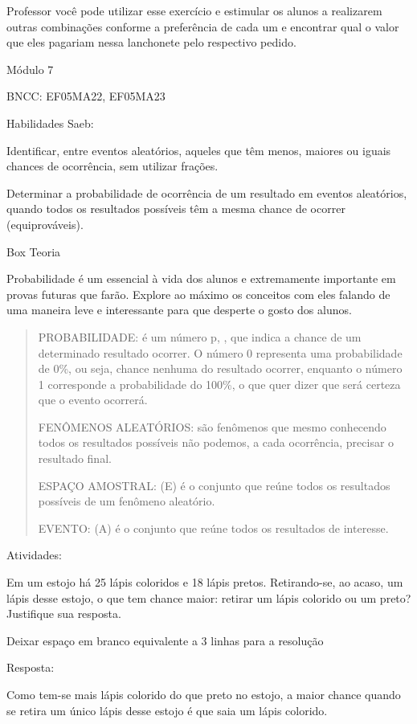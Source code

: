 Professor você pode utilizar esse exercício e estimular os alunos a
realizarem outras combinações conforme a preferência de cada um e
encontrar qual o valor que eles pagariam nessa lanchonete pelo
respectivo pedido.

Módulo 7

BNCC: EF05MA22, EF05MA23

Habilidades Saeb:

Identificar, entre eventos aleatórios, aqueles que têm menos, maiores ou
iguais chances de ocorrência, sem utilizar frações.

Determinar a probabilidade de ocorrência de um resultado em eventos
aleatórios, quando todos os resultados possíveis têm a mesma chance de
ocorrer (equiprováveis).

Box Teoria

Probabilidade é um essencial à vida dos alunos e extremamente importante
em provas futuras que farão. Explore ao máximo os conceitos com eles
falando de uma maneira leve e interessante para que desperte o gosto dos
alunos.

\begin{quote}
PROBABILIDADE: é um número p, , que indica a chance de um determinado
resultado ocorrer. O número 0 representa uma probabilidade de 0\%, ou
seja, chance nenhuma do resultado ocorrer, enquanto o número 1
corresponde a probabilidade do 100\%, o que quer dizer que será certeza
que o evento ocorrerá.

FENÔMENOS ALEATÓRIOS: são fenômenos que mesmo conhecendo todos os
resultados possíveis não podemos, a cada ocorrência, precisar o
resultado final.

ESPAÇO AMOSTRAL: (E) é o conjunto que reúne todos os resultados
possíveis de um fenômeno aleatório.

EVENTO: (A) é o conjunto que reúne todos os resultados de interesse.
\end{quote}

Atividades:

Em um estojo há 25 lápis coloridos e 18 lápis pretos. Retirando-se, ao
acaso, um lápis desse estojo, o que tem chance maior: retirar um lápis
colorido ou um preto? Justifique sua resposta.

Deixar espaço em branco equivalente a 3 linhas para a resolução

Resposta:

Como tem-se mais lápis colorido do que preto no estojo, a maior chance
quando se retira um único lápis desse estojo é que saia um lápis
colorido.

